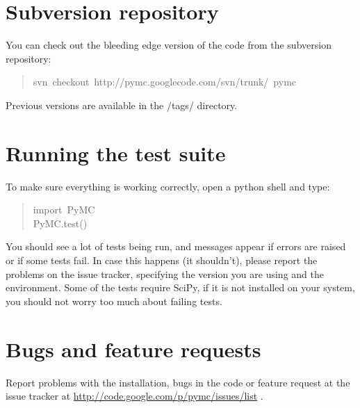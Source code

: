 
\hypertarget{subversion-repository}{}
\section*{Subversion repository}

You can check out the bleeding edge version of the code from the subversion
repository:
\begin{quote}{\ttfamily \raggedright \noindent
svn~checkout~http://pymc.googlecode.com/svn/trunk/~pymc
}\end{quote}

Previous versions are available in the /tags/ directory.



\hypertarget{running-the-test-suite}{}
\section*{Running the test suite}

To make sure everything is working correctly, open a python shell and type:
\begin{quote}{\ttfamily \raggedright \noindent
import~PyMC~\\
PyMC.test()
}\end{quote}

You should see a lot of tests being run, and messages appear if errors are
raised or if some tests fail. In case this happens (it shouldn't), please report
the problems on the issue tracker, specifying the version you are using and the
environment. Some of the tests require SciPy, if it is not installed on your
system, you should not worry too much about failing tests.



\hypertarget{bugs-and-feature-requests}{}
\section*{Bugs and feature requests}

Report problems with the installation, bugs in the code or feature request at
the issue tracker at \href{http://code.google.com/p/pymc/issues/list}{http://code.google.com/p/pymc/issues/list} .

\
